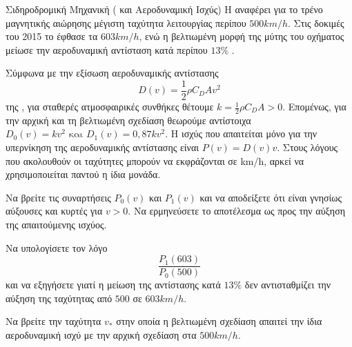 \begin{problhma}{Σιδηροδρομική Μηχανική ( και Αεροδυναμική Ισχύς)}
Η  αναφέρει για το τρένο μαγνητικής αιώρησης
 μέγιστη ταχύτητα λειτουργίας περίπου
$500\si{km/h}$. Στις δοκιμές του 2015 το  έφθασε τα
$603\si{km/h}$, ενώ η βελτιωμένη μορφή της μύτης του οχήματος μείωσε
την αεροδυναμική αντίσταση κατά περίπου $13\%$
\cite{jrCentralSCMaglevTests,jrCentralL0Design}.

Σύμφωνα με την εξίσωση αεροδυναμικής αντίστασης
\[
  D(v)=\frac{1}{2}\rho C_D A v^2
\]
της  \cite{nasaDragEquation}, για σταθερές ατμοσφαιρικές
συνθήκες θέτουμε $k=\frac{1}{2}\rho C_DA>0$. Επομένως, για την αρχική
και τη βελτιωμένη σχεδίαση θεωρούμε αντίστοιχα $D_0(v)=kv^2
  \text{ και }
  D_1(v)=0{,}87kv^2.$
Η ισχύς που απαιτείται μόνο για την υπερνίκηση της αεροδυναμικής
αντίστασης είναι $P(v)=D(v)v$. Στους λόγους που ακολουθούν οι ταχύτητες
μπορούν να εκφράζονται σε \si{km/h}, αρκεί να χρησιμοποιείται παντού η
ίδια μονάδα.

\begin{alist}
\item Να βρείτε τις συναρτήσεις $P_0(v)$ και $P_1(v)$ και να αποδείξετε
      ότι είναι γνησίως αύξουσες και κυρτές για $v>0$. Να ερμηνεύσετε
      το αποτέλεσμα ως προς την αύξηση της απαιτούμενης ισχύος.
\item Να υπολογίσετε τον λόγο
      \[
        \frac{P_1(603)}{P_0(500)}
      \]
      και να εξηγήσετε γιατί η μείωση της αντίστασης κατά $13\%$ δεν
      αντισταθμίζει την αύξηση της ταχύτητας από $500$ σε
      $603\si{km/h}$.
\item Να βρείτε την ταχύτητα $v_*$ στην οποία η βελτιωμένη σχεδίαση
      απαιτεί την ίδια αεροδυναμική ισχύ με την αρχική σχεδίαση στα
      $500\si{km/h}$.
\end{alist}

\begin{center}
\end{center}
\end{problhma}
